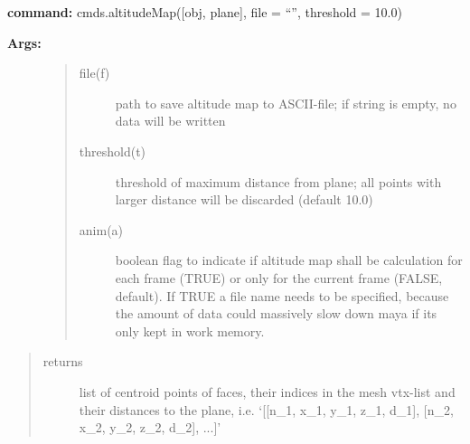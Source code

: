 \documentclass[letterpaper,10pt,english]{sphinxmanual}
\begin{document}
\textbf{command:} cmds.altitudeMap({[}obj, plane{]}, file = ``'', threshold = 10.0)
\begin{description}
\item[{\textbf{Args:}}] \leavevmode\begin{quote}\begin{description}
\item[{file(f)}] \leavevmode
path to save altitude map to ASCII-file; if string is empty, no data will be written

\item[{threshold(t)}] \leavevmode
threshold of maximum distance from plane; all points with larger distance will be discarded (default 10.0)

\item[{anim(a)}] \leavevmode
boolean flag to indicate if altitude map shall be calculation for each frame (TRUE) or only for the current frame (FALSE, default). If TRUE a file name needs to be specified, because the amount of data could massively slow down maya if its only kept in work memory.

\end{description}\end{quote}

\end{description}
\begin{quote}\begin{description}
\item[{returns}] \leavevmode
list of centroid points of faces, their indices in the mesh vtx-list and their distances to the plane, i.e. `{[}{[}n\_1, x\_1, y\_1, z\_1, d\_1{]}, {[}n\_2, x\_2, y\_2, z\_2, d\_2{]}, ...{]}'

\end{description}\end{quote}
\end{document}
